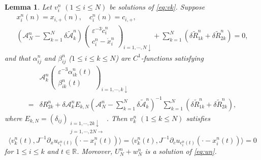 \documentclass[11pt]{amsart}
\newtheorem{lemma}[theorem]{Lemma}
\theoremstyle{remark}
\numberwithin{equation}{section}
\begin{document}
\begin{lemma}
  \label{lem:modulation}
Let $v_i^n$ $(1\le i\le N)$ be solutions of \eqref{eq:vk}. Suppose
\begin{gather}
\label{eq:xcinit}
x_i^n(n)=x_{i,+}(n),\quad c_i^n(n)=c_{i,+},\\
  \label{eq:modeq1}
\left(\mathcal{A}_N^n-\sum_{k=1}^N\delta\widetilde{\mathcal{A}}_k^n\right)
\begin{pmatrix}{\varepsilon}^{-3}\dot{c}_i^n\\ c_i^n-\dot{x}_i^n
\end{pmatrix}_{i=1,\cdots,N\downarrow}
+\sum_{k=1}^N(\delta{\widetilde{R}}_{1k}^n+\delta{\widetilde{R}}_{2k}^n)=0,
\end{gather}
and that $\alpha_{ij}^n$ and $\beta_{ij}^n$ ($1\le i\le k\le N$) are
$C^1$-functions satisfying
\begin{equation}
  \label{eq:orthvk3}
\begin{split}
& \mathcal{A}_k^n\begin{pmatrix}
{\varepsilon}^{-3}\alpha_{ik}^n(t)\\ \beta_{ik}^n(t) \end{pmatrix}_{i=1,\cdots,k\downarrow}
\\ =& \delta R_{2k}^n +\delta\mathcal{A}_k^nE_{k,N}
(\mathcal{A}_N^n-\sum_{k=1}^N\delta\widetilde{\mathcal{A}}_k^n)^{-1}
\sum_{k=1}^N(\delta{\widetilde{R}}_{1k}^n+\delta{\widetilde{R}}_{2k}^n),
\end{split}
\end{equation}
where $E_{k,N}=(\delta_{ij})_{\substack{i=1,\cdots,2k\downarrow\\j=1,\cdots,2N\rightarrow}}$.
Then $v_k^n$ $(1\le k\le N)$ satisfies
\begin{equation}
\label{eq:orthv2k}
{\langle} v_k^n(t),J^{-1}{\partial}_xu_{c_i^n(t)}(\cdot-x_i^n(t)){\rangle}
={\langle} v_k^n(t),J^{-1}{\partial}_cu_{c_i^n(t)}(\cdot-x_i^n(t)){\rangle}=0
\end{equation}
for $1\le i\le k$ and $t\in{\mathbb{R}}$.
Moreover, $U_N^n+w_N^n$ is a solution of \eqref{eq:un}.
\end{lemma}
\end{document}
